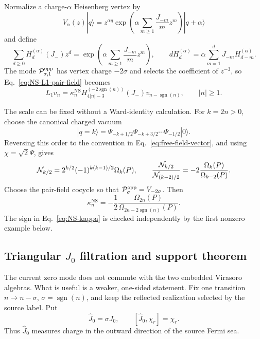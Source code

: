 \documentclass[11pt]{article}
\begin{document}
Normalize a charge-\(\alpha\) Heisenberg vertex by
\begin{equation}
 V_\alpha(z)|q\rangle
 =z^{\alpha q}
 \exp\left(\alpha\sum_{m\geq1}\frac{J_{-m}}m z^m\right)
 |q+\alpha\rangle
\end{equation}
and define
\begin{equation}
 \sum_{d\geq0}H_d^{(\alpha)}(J_-)z^d
 =\exp\left(\alpha\sum_{m\geq1}\frac{J_{-m}}m z^m\right),
 \qquad
 dH_d^{(\alpha)}
 =\alpha\sum_{m=1}^dJ_{-m}H_{d-m}^{(\alpha)}.
 \label{eq:NS-Heisenberg-polynomials}
\end{equation}
The mode \({\cal P}^{\mathrm{opp}}_{\sigma,1}\) has vertex charge
\(-2\sigma\) and selects the coefficient of \(z^{-3}\), so
Eq.~\eqref{eq:NS-L1-pair-field} becomes
\begin{equation}
 \boxed{
 L_1v_n=\kappa_n^{\mathrm{NS}}
 H_{4|n|-3}^{(-2\operatorname{sgn}(n))}(J_-)
 v_{n-\operatorname{sgn}(n)},
 \qquad |n|\geq1.}
 \label{eq:NS-L1-Heisenberg-construction}
\end{equation}

The scale can be fixed without a Ward-identity calculation.  For
\(k=2n>0\), choose the canonical charged vacuum
\begin{equation}
 |q=k\rangle
 =\Psi_{-k+1/2}\Psi_{-k+3/2}\cdots\Psi_{-1/2}|0\rangle.
\end{equation}
Reversing this order to the convention in
Eq.~\eqref{eq:free-field-vector}, and using \(\chi=\sqrt2\Psi\), gives
\begin{equation}
 {\cal N}_{k/2}
 =2^{k/2}(-1)^{k(k-1)/2}\Omega_k(P),
 \qquad
 \frac{{\cal N}_{k/2}}{{\cal N}_{(k-2)/2}}
 =-2\frac{\Omega_k(P)}{\Omega_{k-2}(P)}.
\end{equation}
Choose the pair-field cocycle so that
\({\cal P}^{\mathrm{opp}}_\sigma=V_{-2\sigma}\).  Then
\begin{equation}
 \boxed{
 \kappa_n^{\mathrm{NS}}
 =-\frac12
 \frac{\Omega_{2n}(P)}
      {\Omega_{2n-2\operatorname{sgn}(n)}(P)}.}
 \label{eq:NS-kappa}
\end{equation}
The sign in Eq.~\eqref{eq:NS-kappa} is checked independently by the first
nonzero example below.

\subsection{Triangular \texorpdfstring{\(J_0\)}{J0} filtration and support
theorem}

The current zero mode does not commute with the two embedded Virasoro
algebras.  What is useful is a weaker, one-sided statement.  Fix one
transition \(n\to n-\sigma\), \(\sigma=\operatorname{sgn}(n)\), and keep
the reflected realization selected by the source label.  Put
\begin{equation}
 \widehat J_0=\sigma J_0,
 \qquad
 [\widehat J_0,\chi_r]=\chi_r.
 \label{eq:NS-outward-current}
\end{equation}
Thus \(\widehat J_0\) measures charge in the outward direction of the
source Fermi sea.
\end{document}
